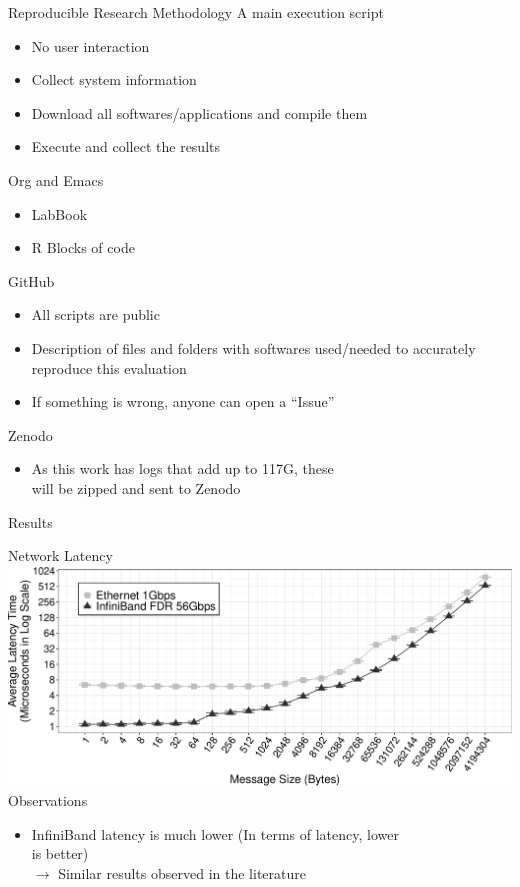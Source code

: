 \documentclass{beamer}
\begin{document}
\begin{frame}{Reproducible Research Methodology}
\vfill
A main execution script
\begin{itemize}
    \item No user interaction
    \item Collect system information
    \item Download all softwares/applications and compile them
    \item Execute and collect the results
\end{itemize}

\pause Org and Emacs
\begin{itemize}
    \item LabBook
    \item R Blocks of code
\end{itemize}

\pause GitHub
\begin{itemize}
    \item All scripts are public
    \item Description of files and folders with softwares used/needed to accurately reproduce this evaluation
    \item If something is wrong, anyone can open a ``Issue''
\end{itemize}

\pause Zenodo
\begin{itemize}
    \item As this work has logs that add up to 117G, these \\will be zipped and sent to Zenodo
\end{itemize}
\end{frame}


\begin{frame} 
\begin{block}{}
\begin{center}
\Huge{Results}
\end{center}
\end{block}
\end{frame}

\begin{frame}{Network Latency}
\includegraphics[width=\textwidth]{SLIDES/img/Latency.pdf}
\vfill
\pause Observations
\begin{itemize}
    \item InfiniBand latency is \alert{much lower} (In terms of latency, lower\\ is better)\\
        $\to$ Similar results observed in the literature
\end{itemize}
\end{frame}
\end{document}
